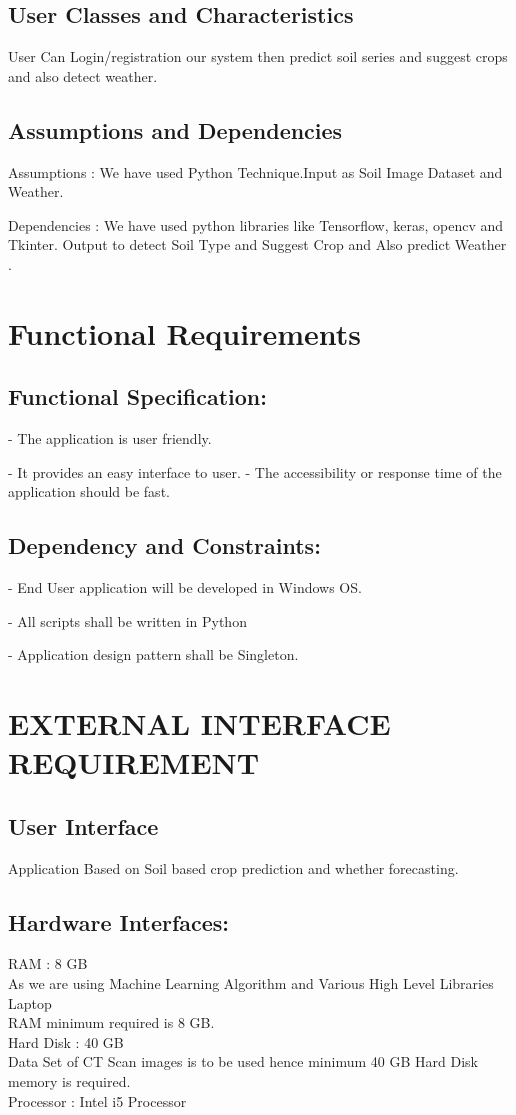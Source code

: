 \documentclass[oneside,a4paper,12pt]{report}
\begin{document}
\subsection{User Classes and Characteristics}
User Can Login/registration our system then predict soil series and suggest crops and also detect weather.
\subsection{Assumptions and Dependencies}
\item Assumptions : We have used Python Technique.Input as Soil Image Dataset and Weather. 
\item Dependencies : We have used python libraries like Tensorflow, keras, opencv and Tkinter. Output to detect Soil Type and Suggest Crop and Also predict Weather .
\section{Functional Requirements}
\subsection{Functional Specification:}
\item - The application is user friendly.
\item - It provides an easy interface to user.
\ite - The accessibility or response time of the application should be fast.
 
\subsection{Dependency and Constraints:}
\item - End User application will be developed in Windows OS.
\item - All scripts shall be written in Python
\item - Application design pattern shall be Singleton.

\section {EXTERNAL INTERFACE REQUIREMENT}
\subsection {User Interface}
 \item Application Based on  Soil based crop prediction 		 and whether forecasting. 
 
 \subsection {Hardware Interfaces:}
 \item RAM : 8 GB\\
As we are using Machine Learning Algorithm and Various High Level Libraries Laptop\\
RAM minimum required is 8 GB.\\
Hard Disk : 40 GB\\
Data Set of CT Scan images is to be used hence minimum 40 GB Hard Disk memory is required.\\
Processor : Intel i5 Processor\\
\end{document}
